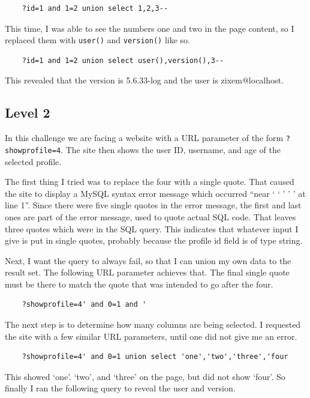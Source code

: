\documentclass{article}
\begin{document}
\begin{verbatim}
	?id=1 and 1=2 union select 1,2,3--
\end{verbatim}

This time, I was able to see the numbers one and two in the page content, so I replaced them with \verb`user()` and \verb`version()` like so.

\begin{verbatim}
	?id=1 and 1=2 union select user(),version(),3--
\end{verbatim}

This revealed that the version is 5.6.33-log and the user is zixem@localhost.

\subsection{Level 2}

In this challenge we are facing a website with a URL parameter of the form \verb`?showprofile=4`. The site then shows the user ID, username, and age of the selected profile.

The first thing I tried was to replace the four with a single quote. That caused the site to display a MySQL syntax error message which occurred ``near ` ` ' ' ' at line 1''. Since there were five single quotes in the error message, the first and last ones are part of the error message, used to quote actual SQL code. That leaves three quotes which were in the SQL query. This indicates that whatever input I give is put in single quotes, probably because the profile id field is of type string.

Next, I want the query to always fail, so that I can union my own data to the result set. The following URL parameter achieves that. The final single quote must be there to match the quote that was intended to go after the four.

\begin{verbatim}
	?showprofile=4' and 0=1 and '
\end{verbatim}

The next step is to determine how many columns are being selected. I requested the site with a few similar URL parameters, until one did not give me an error.

\begin{verbatim}
	?showprofile=4' and 0=1 union select 'one','two','three','four
\end{verbatim}

This showed `one'. `two', and `three' on the page, but did not show `four'. So finally I ran the following query to reveal the user and version.
\end{document}
